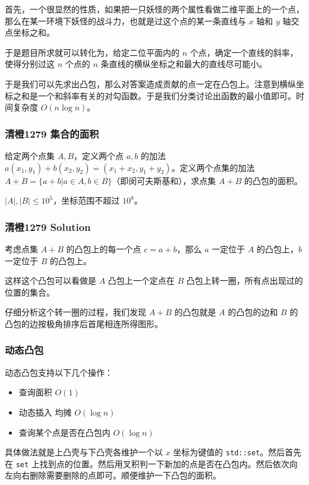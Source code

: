\documentclass[10pt]{beamer}
\begin{document}
\begin{CJK}{UTF8}{gkai}
\begin{spacing}{1.2}
\begin{frame}
			首先，一个很显然的性质，如果把一只妖怪的两个属性看做二维平面上的一个点，那么在某一环境下妖怪的战斗力，也就是过这个点的某一条直线与 $x$ 轴和 $y$ 轴交点坐标之和。 \pause

			于是题目所求就可以转化为，给定二位平面内的 $n$ 个点，确定一个直线的斜率，使得分别过这 $n$ 个点的 $n$ 条直线的横纵坐标之和最大的直线尽可能小。 \pause

			于是我们可以先求出凸包，那么对答案造成贡献的点一定在凸包上。注意到横纵坐标之和是一个和斜率有关的对勾函数。于是我们分类讨论出函数的最小值即可。时间复杂度 $O(n \log n)$。

		\end{frame}
		\begin{frame}
			\frametitle{清橙1279 集合的面积}

			给定两个点集 $A,B$，定义两个点 $a,b$ 的加法 $a(x_1,y_1) + b(x_2,y_2) = (x_1 + x_2,y_1 + y_2)$。定义两个点集的加法 $A + B = \{a + b| a \in A, b \in B\}$（即闵可夫斯基和），求点集 $A + B$ 的凸包的面积。

			$|A|, |B| \le 10^5$，坐标范围不超过 $10^8$。

		\end{frame}
		\begin{frame}
			\frametitle{清橙1279 Solution}

			考虑点集 $A + B$ 的凸包上的每一个点 $c = a + b$，那么 $a$ 一定位于 $A$ 的凸包上，$b$ 一定位于 $B$ 的凸包上。 \pause

			这样这个凸包可以看做是 $A$ 凸包上一个定点在 $B$ 凸包上转一圈，所有点出现过的位置的集合。 \pause
			
			仔细分析这个转一圈的过程，我们发现 $A + B$ 的凸包就是 $A$ 的凸包的边和 $B$ 的凸包的边按极角排序后首尾相连所得图形。

		\end{frame}
		\begin{frame}
			\frametitle{动态凸包}

			\pause
			动态凸包支持以下几个操作：
			\begin{itemize}
				\item 查询面积 $O(1)$
				\item 动态插入 均摊 $O(\log n)$
				\item 查询某个点是否在凸包内 $O(\log n)$
			\end{itemize}
			\pause
			具体做法就是上凸壳与下凸壳各维护一个以 $x$ 坐标为键值的 \texttt{std::set}。然后首先在 \texttt{set} 上找到点的位置。然后用叉积判一下新加的点是否在凸包内。然后依次向左向右删除需要删除的点即可。顺便维护一下凸包的面积。 \pause


\end{frame}
\end{spacing}
\end{CJK}
\end{document}

